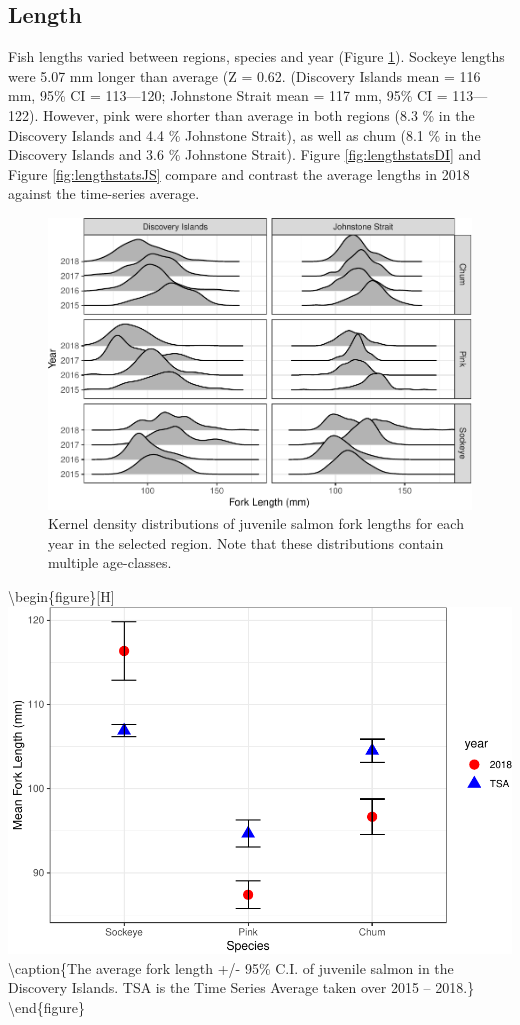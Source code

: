 \documentclass[fleqn,10pt]{wlpeerj} %
\begin{document}
\subsection*{Length}\label{length}

Fish lengths varied between regions, species and year (Figure
\ref{fig:length}). Sockeye lengths were 5.07 mm longer than average (Z =
0.62. (Discovery Islands mean = 116 mm, 95\% CI = 113---120; Johnstone
Strait mean = 117 mm, 95\% CI = 113---122). However, pink were shorter
than average in both regions (8.3 \% in the Discovery Islands and 4.4 \%
Johnstone Strait), as well as chum (8.1 \% in the Discovery Islands and
3.6 \% Johnstone Strait). Figure \ref{fig:lengthstatsDI} and Figure
\ref{fig:lengthstatsJS} compare and contrast the average lengths in 2018
against the time-series average.

\begin{figure}[H]
\includegraphics[width=0.8\linewidth]{peer_j_migration_dynamics_files/figure-latex/length-1} \caption{Kernel density distributions of juvenile salmon fork lengths for each year in the selected region. Note that these distributions contain multiple age-classes.}\label{fig:length}
\end{figure}

\textbackslash{}begin\{figure\}{[}H{]}
\includegraphics[width=0.8\linewidth]{peer_j_migration_dynamics_files/figure-latex/lengthstatsDI-1}
\textbackslash{}caption\{The average fork length +/- 95\% C.I. of
juvenile salmon in the Discovery Islands. TSA is the Time Series Average
taken over 2015 -- 2018.\}\label{fig:lengthstatsDI}
\textbackslash{}end\{figure\}
\end{document}
